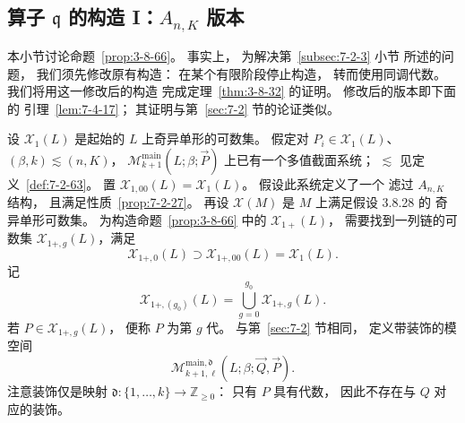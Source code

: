 
\subsection{算子 $\mathfrak q$ 的构造 I：$A_{n,K}$ 版本}
\label{subsec:7-4-2}

本小节讨论命题~\ref{prop:3-8-66}。
事实上，
为解决第~\ref{subsec:7-2-3} 小节
所述的问题，
我们须先修改原有构造：
在某个有限阶段停止构造，
转而使用同调代数。
我们将用这一修改后的构造
完成定理~\ref{thm:3-8-32} 的证明。
修改后的版本即下面的
引理~\ref{lem:7-4-17}；
其证明与第~\ref{sec:7-2} 节的论证类似。

设 \(\mathcal X_1(L)\) 是起始的
\(L\) 上奇异单形的可数集。
假定对
\(P_i\in\mathcal X_1(L)\)、
\((\beta,k)\lesssim(n,K)\)，
\(\mathcal M^{\mathrm{main}}_{k+1}
(L;\beta;\vec P)\)
上已有一个多值截面系统；
\(\lesssim\) 见定义~\ref{def:7-2-63}。
置
\(\mathcal X_{1,00}(L)=\mathcal X_1(L)\)。
假设此系统定义了一个
滤过 \(A_{n,K}\) 结构，
且满足性质~\ref{prop:7-2-27}。
再设 \(\mathcal X(M)\) 是
\(M\) 上满足假设 3.8.28 的
奇异单形可数集。
为构造命题~\ref{prop:3-8-66} 中的
\(\mathcal X_{1+}(L)\)，
需要找到一列链的可数集
\(\mathcal X_{1+,g}(L)\)，满足
\[
\mathcal X_{1+,0}(L)
\supset\mathcal X_{1+,00}(L)
=\mathcal X_1(L).
\]
记
\[
\mathcal X_{1+,(g_0)}(L)
=\bigcup_{g=0}^{g_0}
\mathcal X_{1+,g}(L).
\]
若 \(P\in\mathcal X_{1+,g}(L)\)，
便称 \(P\) 为第 \(g\) 代。
与第~\ref{sec:7-2} 节相同，
定义带装饰的模空间
\[
\mathcal M^{\mathrm{main},\mathfrak d}_{k+1,\ell}
(L;\beta;\vec Q,\vec P).
\]
注意装饰仅是映射
\(\mathfrak d\colon
\{1,\ldots,k\}\to\mathbb Z_{\ge0}\)：
只有 \(P\) 具有代数，
因此不存在与 \(Q\) 对应的装饰。

